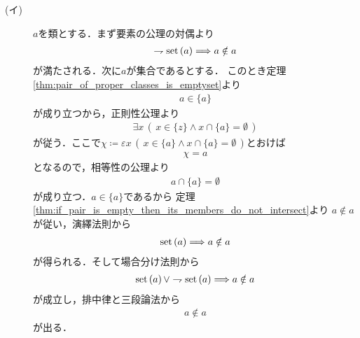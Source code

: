 	\begin{prf}\mbox{}
		\begin{description}
			\item[(イ)] $a$を類とする．まず要素の公理の対偶より
				\begin{align}
					\rightharpoondown \operatorname*{set} \left(a\right) \Longrightarrow a \notin a
				\end{align}
				が満たされる．次に$a$が集合であるとする．
				このとき定理\ref{thm:pair_of_proper_classes_is_emptyset}より
				\begin{align}
					a \in \{a\}
				\end{align}
				が成り立つから，正則性公理より
				\begin{align}
					\exists x\, \left(\, x \in \{z\} \wedge x \cap \{a\} = \emptyset\, \right)
				\end{align}
				が従う．ここで$\chi \coloneqq \varepsilon x\, \left(\, x \in \{a\} \wedge x \cap \{a\} = \emptyset\, \right)$とおけば
				\begin{align}
					\chi = a
				\end{align}
				となるので，相等性の公理より
				\begin{align}
					a \cap \{a\} = \emptyset
				\end{align}
				が成り立つ．$a \in \{a\}$であるから
				定理\ref{thm:if_pair_is_empty_then_its_members_do_not_intersect}より
				$a \notin a$が従い，演繹法則から
				\begin{align}
					\operatorname*{set} \left(a\right) \Longrightarrow a \notin a
				\end{align}
				が得られる．そして場合分け法則から
				\begin{align}
					\operatorname*{set} \left(a\right) \vee \rightharpoondown \operatorname*{set} \left(a\right) \Longrightarrow a \notin a
				\end{align}
				が成立し，排中律と三段論法から
				\begin{align}
					a \notin a
				\end{align}
				が出る．
			

\end{description}
\end{prf}
